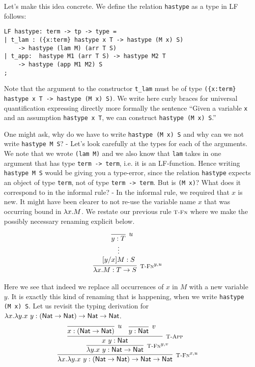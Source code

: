 Let's make this idea concrete. We define the relation \lstinline!hastype! as
a type in LF follows:

\begin{lstlisting}
LF hastype: term -> tp -> type =
| t_lam : ({x:term} hastype x T -> hastype (M x) S)
	-> hastype (lam M) (arr T S)
| t_app:  hastype M1 (arr T S) -> hastype M2 T
	-> hastype (app M1 M2) S
;
\end{lstlisting}

Note that the argument to the constructor \lstinline!t_lam! must be of type
\lstinline!({x:term} hastype x T -> hastype (M x) S)!. We write here curly braces
for universal quantification expressing directly more formally the sentence
``Given a variable \lstinline!x! and an assumption \lstinline!hastype x T!, we can
construct \lstinline!hastype (M x) S!.''

One might ask, why do we have to write \lstinline!hastype (M x) S! and why can
we not write \lstinline!hastype M S!? - Let's look carefully at the types for
each of the arguments. We note that we wrote \lstinline!(lam M)! and we also
know that \lstinline!lam! takes in one argument that has type
\lstinline!term -> term!, i.e. it is an LF-function. Hence writing \lstinline!hastype M S! would be
giving you a type-error, since the relation \lstinline!hastype! expects an
object of type \lstinline!term!, not of type \lstinline!term -> term!.
But is \lstinline!(M x)!? What does it correspond to in the informal rule? - In the
informal rule, we required that $x$ is new. It might have been clearer to not
re-use the variable name $x$ that was occurring bound in $\lambda
x.M$. We restate our previous rule $\textsc{\footnotesize T-Fn}$ where we make the possibly necessary
renaming explicit below.

\[
\begin{array}{c}
\infer[\TFn^{y,u}]{\lam x.M : T \arrow S}
                 {\hypo{\quad\infer[u]{y:T}{}}{[y/x]M:S}}
\end{array}
\]

Here we see that indeed we replace all occurrences of $x$ in $M$ with a new
variable $y$. It is exactly this kind of renaming that is happening, when we
write \lstinline!hastype (M x) S!.
Let us revisit the typing derivation for $\lambda x.\lambda y.x~y : (\textsf{Nat} \rightarrow
\textsf{Nat}) \rightarrow \textsf{Nat} \rightarrow \textsf{Nat}$. 
\[
\infer[\TFn^{x,u}]{\lam x.\lam y.x~y : (\Nat \arrow \Nat) \arrow \Nat \arrow \Nat}
 {\infer[\TFn^{y,v}]{\lam y.x~y :  \Nat  \arrow \Nat}
           {\infer[\TApp]{x~y :\Nat}
                      {\infer[u]{x: (\Nat \arrow \Nat) }{} & 
                        \infer[v]{ y: \Nat }{} & 
                      }
                    }
                  }
\]

